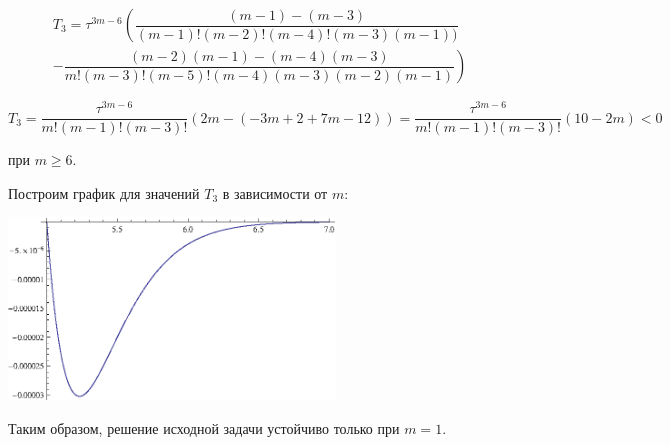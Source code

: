 \begin{multline*}
T_3 = \tau^{3m-6} \left( \dfrac{(m-1) - (m-3)}{(m-1)!(m-2)!(m-4)!(m-3)(m-1))} \right. \\ \left. - \dfrac{(m-2)(m-1) - (m-4)(m-3)}{m!(m-3)!(m-5)!(m-4)(m-3)(m-2)(m-1)} \right)
\end{multline*}

\begin{equation*}
T_3 = \dfrac{\tau^{3m-6}}{m!(m-1)!(m-3)!} (2m - (-3m + 2 + 7m - 12)) = \dfrac{\tau^{3m-6}}{m!(m-1)!(m-3)!} (10-2m) < 0
\end{equation*}

при $m \geq 6$.

Построим график для значений $T_3$ в зависимости от $m$:

\begin{center}
\includegraphics[width=0.65\textwidth]{coefCheck.eps}
\end{center}

Таким образом, решение исходной задачи устойчиво только при $m=1$.